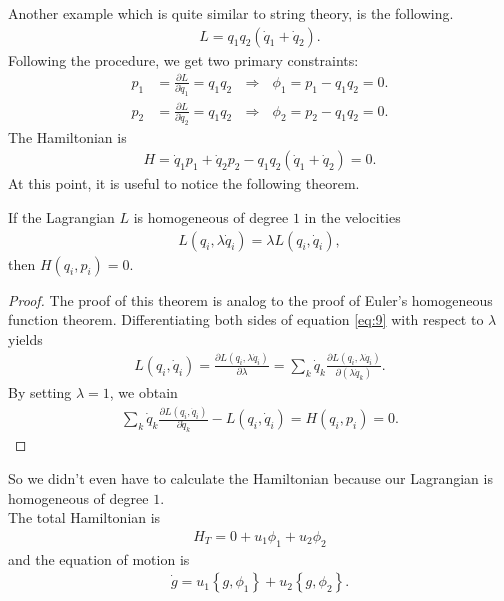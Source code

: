Another example which is quite similar to string theory, is the following. 
\begin{align}
L = q_1 q_2 (\dot{q}_1 + \dot{q}_2).
\end{align}
Following the procedure, we get two primary constraints:
\begin{align}
p_1 &= \frac{\partial L}{\partial \dot{q}_1} = q_1 q_2 \ \ \ \Longrightarrow \ \ \ \phi_1 = p_1 - q_1 q_2 = 0. \\
p_2 &= \frac{\partial L}{\partial \dot{q}_2} = q_1 q_2 \ \ \ \Longrightarrow \ \ \ \phi_2 = p_2 - q_1 q_2 = 0.
\end{align}
The Hamiltonian is
\begin{align}
H = \dot{q}_1 p_1 + \dot{q}_2 p_2 - q_1 q_2 (\dot{q}_1 + \dot{q}_2) = 0.
\end{align}
At this point, it is useful to notice the following theorem. \\

\begin{theorem}
\label{Theorem}
If the Lagrangian $L$ is homogeneous of degree $1$ in the velocities  
\begin{align}
L(q_i,\lambda \dot{q}_i) = \lambda L(q_i,\dot{q}_i), \label{eq:9}
\end{align}
then $H(q_i,p_i) = 0$.
\end{theorem}
\begin{proof}
The proof of this theorem is analog to the proof of Euler's homogeneous function theorem. 
Differentiating both sides of equation \eqref{eq:9} with respect to $\lambda$ yields
\begin{align}
L(q_i,\dot{q}_i) = \frac{\partial L(q_i,\lambda \dot{q}_i)}{\partial \lambda} = \sum_k \dot{q}_k \frac{\partial L(q_i,\lambda \dot{q}_i)}{\partial (\lambda \dot{q}_k)} .
\end{align}
By setting $\lambda = 1$, we obtain
\begin{align}
\sum_k \dot{q}_k \frac{\partial L(q_i,\dot{q}_i)}{\partial \dot{q}_k} - L(q_i,\dot{q}_i) = H(q_i,p_i) = 0.
\end{align}
\end{proof}

So we didn't even have to calculate the Hamiltonian because our Lagrangian is homogeneous of degree $1$. \\

The total Hamiltonian is
\begin{align}
H_T = 0 + u_1 \phi_1 + u_2 \phi_2
\end{align}
and the equation of motion is
\begin{align}
\dot{g} = u_1 \left \{ g, \phi_1 \right \} + u_2 \left \{ g, \phi_2 \right \}.
\end{align}

